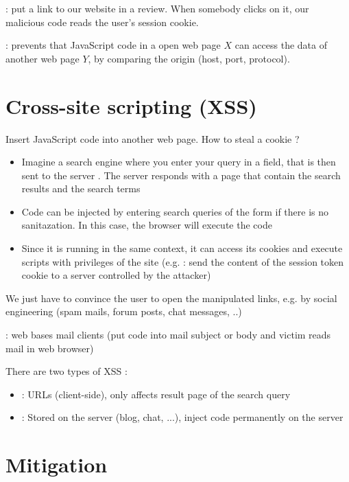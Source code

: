  : put a link to our website in a review. When somebody clicks on it, our malicious code reads the user's session cookie.

 : prevents that JavaScript code in a open web page $X$ can access the data of another web page $Y$, by comparing the origin (host, port, protocol).

\section{Cross-site scripting (XSS)}

Insert JavaScript code into another web page. How to steal a cookie ?

\begin{itemize}
    \item Imagine a search engine where you enter your query in a  field, that is then sent to the server . The server responds with a page that contain the search results and the search terms
    \item Code can be injected by entering search queries of the form  if there is no sanitazation. In this case, the browser will execute the code
    \item Since it is running in the same context, it can access its cookies and execute scripts with privileges of the site (e.g. : send the content of the session token cookie to a server controlled by the attacker)
\end{itemize}

We just have to convince the user to open the manipulated links, e.g. by social engineering (spam mails, forum posts, chat messages, ..)

 : web bases mail clients (put code into mail subject or body and victim reads mail in web browser)

There are two types of XSS :
\begin{itemize}
    \item {} : URLs (client-side), only affects result page of the search query
    \item {} : Stored on the server (blog, chat, ...), inject code permanently on the server
\end{itemize}

\section{Mitigation}

